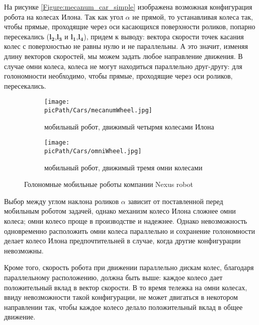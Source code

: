 \documentclass[oneside,final,14pt]{extreport}
\newcommand{\picPath}{img}
\newcommand{\bs}{\boldsymbol}
\begin{document}
На рисунке \ref{Figure:mecanum_car_simple} изображена возможная конфигурация робота на колесах Илона. Так как угол $\alpha$ не прямой, то устанавливая колеса так, чтобы прямые, проходящие через оси касающихся поверхности роликов, попарно пересекались ($\bs{l_{2}}$,$\bs{l_{3}}$ и $\bs{l_{1}}$,$\bs{l_{4}}$), придем к выводу: вектора скорости точек касания колес с поверхностью не равны нулю и не параллельны. А это значит, изменяя длину векторов скоростей, мы можем задать любое направление движения. В случае омни колеса, колеса не могут находиться параллельно друг-другу: для голономности необходимо, чтобы прямые, проходящие через оси роликов, пересекались. 

\begin{figure}[H]
\end{figure}

\begin{figure}[H]
  \centering
  \begin{subfigure}[b]{0.4\linewidth}
   \texttt{[image: \\picPath/Cars/mecanumWheel.jpg]}
    \caption{ мобильный робот, движимый четырмя колесами Илона }
  \end{subfigure}
  \begin{subfigure}[b]{0.4\linewidth}
    \texttt{[image: \\picPath/Cars/omniWheel.jpg]}
    \caption{ мобильный робот, движимый тремя омни колесами }
  \end{subfigure}
  \caption{ Голономные мобильные роботы компании Nexus robot}
  \label{Figure:holonomicRobots}
\end{figure}
Выбор между углом наклона роликов $\alpha$ зависит от поставленной перед мобильным роботом задачей, однако механизм колесо Илона сложнее омни колеса; омни колесо проще в производстве и надежнее. Однако невозможность одновременно расположить омни колеса параллельно и сохранение голономности делает колесо Илона предпочтительней в случае, когда другие конфигурации невозможны.  

Кроме того, скорость робота при движении параллельно дискам колес, благодаря параллельному расположению, должна быть выше: каждое колесо дает положительный вклад в вектор скорости. В то время тележка на омни колесах, ввиду невозможности такой конфигурации, не может двигаться в некотором направлении так, чтобы каждое колесо делало положительный вклад в общее движение.   
\end{document}
